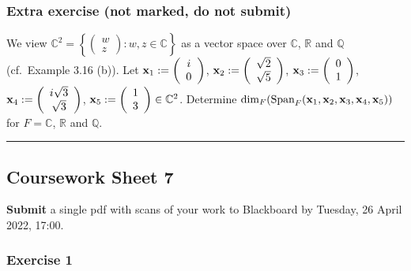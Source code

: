 \documentclass[
  12pt,
  a4paper,
  twoside]{article}
\theoremstyle{plain}
\theoremstyle{definition}
\begin{document}
\hypertarget{extra-exercise-not-marked-do-not-submit}{%
\subsubsection*{Extra exercise (not marked, do not submit)}\label{extra-exercise-not-marked-do-not-submit}}

We view \(\mathbb{C}^2 = \left\{\left(\begin{array}{c} w \\ z \end{array}\right): w, z \in \mathbb{C}\right\}\) as a vector space
over \(\mathbb{C}\), \(\mathbb{R}\) and \(\mathbb{Q}\) (cf.~Example 3.16 (b)). Let
\({\bf x}_1:= \left(\begin{array}{c} i \\ 0 \end{array}\right)\),
\({\bf x}_2:= \left(\begin{array}{c} \sqrt{2} \\ \sqrt{5} \end{array}\right)\),
\({\bf x}_3:= \left(\begin{array}{c} 0 \\ 1 \end{array}\right)\),
\({\bf x}_4:= \left(\begin{array}{c} i\sqrt{3} \\ \sqrt{3} \end{array}\right)\),
\({\bf x}_5:= \left(\begin{array}{c} 1 \\ 3 \end{array}\right) \in \mathbb{C}^2\).
Determine
\(\textrm{dim}_F(\textrm{Span}_F({\bf x}_1, {\bf x}_2, {\bf x}_3, {\bf x}_4, {\bf x}_5))\) for \(F= \mathbb{C}\), \(\mathbb{R}\) and \(\mathbb{Q}\).

\begin{center}\rule{0.5\linewidth}{0.5pt}\end{center}

\hypertarget{coursework-sheet-7}{%
\subsection{Coursework Sheet 7}\label{coursework-sheet-7}}

\textbf{Submit} a single pdf with scans of your work to Blackboard by Tuesday, 26 April 2022, 17:00.

\hypertarget{exercise-1-6}{%
\subsubsection*{Exercise 1}\label{exercise-1-6}}
\end{document}
